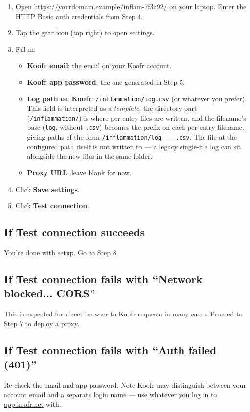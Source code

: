 \documentclass[11pt,a4paper]{article}
\begin{document}
\begin{enumerate}[leftmargin=*]
  \item Open \url{https://yourdomain.example/inflam-7f3a92/} on your laptop. Enter the HTTP Basic auth credentials from Step 4.
  \item Tap the gear icon (top right) to open settings.
  \item Fill in:
  \begin{itemize}[nosep]
    \item \textbf{Koofr email}: the email on your Koofr account.
    \item \textbf{Koofr app password}: the one generated in Step 5.
    \item \textbf{Log path on Koofr}: \texttt{/inflammation/log.csv} (or whatever you prefer). This field is interpreted as a \emph{template}: the directory part (\texttt{/inflammation/}) is where per-entry files are written, and the filename's base (\texttt{log}, without \texttt{.csv}) becomes the prefix on each per-entry filename, giving paths of the form \texttt{/inflammation/log\_\_<entry-date>\_\_<write-ms>.csv}. The file at the configured path itself is not written to --- a legacy single-file log can sit alongside the new files in the same folder.
    \item \textbf{Proxy URL}: leave blank for now.
  \end{itemize}
  \item Click \textbf{Save settings}.
  \item Click \textbf{Test connection}.
\end{enumerate}

\subsection*{If Test connection succeeds}
You're done with setup. Go to Step 8.

\subsection*{If Test connection fails with ``Network blocked... CORS''}
This is expected for direct browser-to-Koofr requests in many cases. Proceed to Step 7 to deploy a proxy.

\subsection*{If Test connection fails with ``Auth failed (401)''}
Re-check the email and app password. Note Koofr may distinguish between your account email and a separate login name --- use whatever you log in to \url{app.koofr.net} with.
\end{document}
